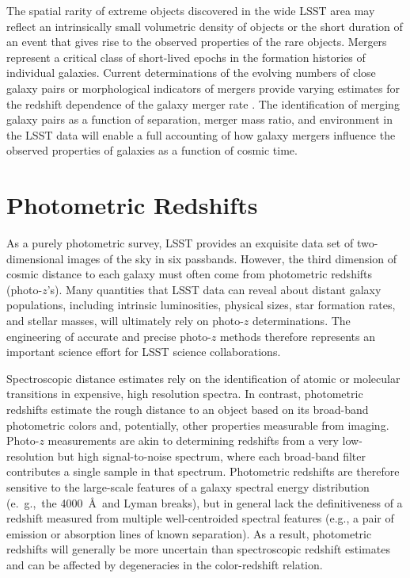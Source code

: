 {The spatial rarity of extreme objects discovered
in the wide LSST area may reflect an intrinsically
small volumetric density of objects or the short duration
of an event that gives rise to the observed properties of the
rare objects. Mergers represent a critical class 
of short-lived epochs in the formation histories of
individual galaxies. Current determinations of the evolving numbers
of close galaxy pairs or morphological indicators of
mergers provide varying estimates for the
redshift dependence of the galaxy merger rate 
\citep[e.g.,][]{darg2010a,conselice2003a,kartaltepe2007a,lotz2008a,lin2008a,kaviraj2009a,robotham2014a,kaviraj2015a}.
The identification of merging
galaxy pairs as a function of separation, merger
mass ratio, and environment in the LSST data will enable
a full accounting of how galaxy mergers influence
the observed properties of galaxies as a function of
cosmic time. 

\vspace{-0.05in}

\section{Photometric Redshifts}
\label{sec:sci:gal:bkgnd:photoz}
As a purely photometric survey, LSST provides an exquisite data set of two-dimensional images of the sky in six passbands.  
However, the third dimension of cosmic distance to each galaxy must often
come from photometric redshifts (photo-$z$'s). Many quantities that LSST data can
reveal about distant galaxy populations, including intrinsic luminosities, physical
sizes, star formation rates, and stellar masses, will ultimately rely on photo-$z$ 
determinations. The engineering of accurate and precise photo-$z$ methods
therefore represents an important science effort for LSST science collaborations.

Spectroscopic distance estimates rely on the identification of atomic or molecular transitions in expensive,
high resolution spectra.  In contrast, photometric redshifts estimate the rough distance to an object based on its broad-band photometric colors and, potentially, other properties measurable from imaging.  
Photo-$z$ measurements are akin to determining redshifts from a very low-resolution but high signal-to-noise spectrum, where each broad-band filter contributes a single sample in that spectrum. Photometric
redshifts are therefore sensitive to the large-scale features of a galaxy spectral energy distribution (e.~g.,~the 4000~\AA\ and Lyman breaks), but in general lack the definitiveness of a redshift measured from multiple well-centroided spectral features (e.g., a pair of emission or absorption lines of known separation). As a result, photometric redshifts will generally be more uncertain than  spectroscopic redshift estimates and can be affected by degeneracies in the color-redshift relation.

}
